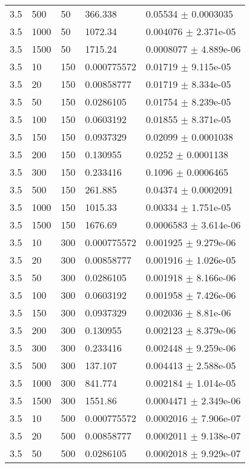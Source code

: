 \begin{longtable}{lllll}
 3.5 &   500 &    50 &  366.338 &  0.05534 $\pm$ 0.0003035 \\
 3.5 &  1000 &    50 &  1072.34 & 0.004076 $\pm$ 2.371e-05 \\
 3.5 &  1500 &    50 &  1715.24 & 0.0008077 $\pm$ 4.889e-06 \\
 3.5 &    10 &   150 & 0.000775572 &  0.01719 $\pm$ 9.115e-05 \\
 3.5 &    20 &   150 & 0.00858777 &  0.01719 $\pm$ 8.334e-05 \\
 3.5 &    50 &   150 & 0.0286105 &  0.01754 $\pm$ 8.239e-05 \\
 3.5 &   100 &   150 & 0.0603192 &  0.01855 $\pm$ 8.371e-05 \\
 3.5 &   150 &   150 & 0.0937329 &  0.02099 $\pm$ 0.0001038 \\
 3.5 &   200 &   150 & 0.130955 &   0.0252 $\pm$ 0.0001138 \\
 3.5 &   300 &   150 & 0.233416 &   0.1096 $\pm$ 0.0006465 \\
 3.5 &   500 &   150 &  261.885 &  0.04374 $\pm$ 0.0002091 \\
 3.5 &  1000 &   150 &  1015.33 &  0.00334 $\pm$ 1.751e-05 \\
 3.5 &  1500 &   150 &  1676.69 & 0.0006583 $\pm$ 3.614e-06 \\
 3.5 &    10 &   300 & 0.000775572 & 0.001925 $\pm$ 9.279e-06 \\
 3.5 &    20 &   300 & 0.00858777 & 0.001916 $\pm$ 1.026e-05 \\
 3.5 &    50 &   300 & 0.0286105 & 0.001918 $\pm$ 8.166e-06 \\
 3.5 &   100 &   300 & 0.0603192 & 0.001958 $\pm$ 7.426e-06 \\
 3.5 &   150 &   300 & 0.0937329 & 0.002036 $\pm$ 8.81e-06 \\
 3.5 &   200 &   300 & 0.130955 & 0.002123 $\pm$ 8.379e-06 \\
 3.5 &   300 &   300 & 0.233416 & 0.002448 $\pm$ 9.259e-06 \\
 3.5 &   500 &   300 &  137.107 & 0.004413 $\pm$ 2.588e-05 \\
 3.5 &  1000 &   300 &  841.774 & 0.002184 $\pm$ 1.014e-05 \\
 3.5 &  1500 &   300 &  1551.86 & 0.0004471 $\pm$ 2.349e-06 \\
 3.5 &    10 &   500 & 0.000775572 & 0.0002016 $\pm$ 7.906e-07 \\
 3.5 &    20 &   500 & 0.00858777 & 0.0002011 $\pm$ 9.138e-07 \\
 3.5 &    50 &   500 & 0.0286105 & 0.0002018 $\pm$ 9.929e-07 \\

\end{longtable}
